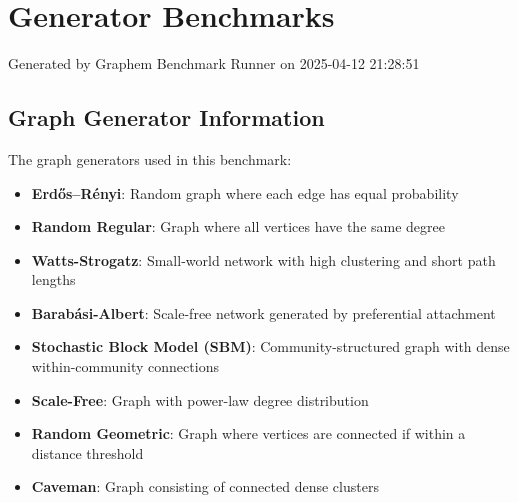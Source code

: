 \documentclass{article}
\begin{document}
\section*{Generator Benchmarks}
Generated by Graphem Benchmark Runner on 2025-04-12 21:28:51
\subsection*{Graph Generator Information}
The graph generators used in this benchmark:
\begin{itemize}
\item \textbf{Erdős–Rényi}: Random graph where each edge has equal probability
\item \textbf{Random Regular}: Graph where all vertices have the same degree
\item \textbf{Watts-Strogatz}: Small-world network with high clustering and short path lengths
\item \textbf{Barabási-Albert}: Scale-free network generated by preferential attachment
\item \textbf{Stochastic Block Model (SBM)}: Community-structured graph with dense within-community connections
\item \textbf{Scale-Free}: Graph with power-law degree distribution
\item \textbf{Random Geometric}: Graph where vertices are connected if within a distance threshold
\item \textbf{Caveman}: Graph consisting of connected dense clusters
\end{itemize}
\end{document}
